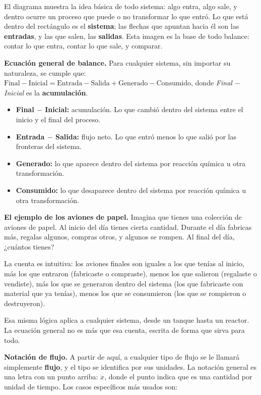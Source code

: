 El diagrama muestra la idea básica de todo sistema: algo entra, algo
sale, y dentro ocurre un proceso que puede o no transformar lo que
entró. Lo que está dentro del rectángulo es el \textbf{sistema}; las
flechas que apuntan hacia él son las \textbf{entradas}, y las que
salen, las \textbf{salidas}. Esta imagen es la base de todo balance:
contar lo que entra, contar lo que sale, y comparar.

\textbf{Ecuación general de balance.} Para cualquier sistema, sin
importar su naturaleza, se cumple que: \\
$\text{Final} - \text{Inicial} = \text{Entrada} - \text{Salida} + \text{Generado} - \text{Consumido}$,
donde \textit{Final $-$ Inicial} es la \textbf{acumulación}.

\begin{itemize}
    \item \textbf{Final $-$ Inicial:} acumulación. Lo que cambió
    dentro del sistema entre el inicio y el final del proceso.
    \item \textbf{Entrada $-$ Salida:} flujo neto. Lo que entró menos
    lo que salió por las fronteras del sistema.
    \item \textbf{Generado:} lo que aparece dentro del sistema por
    reacción química u otra transformación.
    \item \textbf{Consumido:} lo que desaparece dentro del sistema
    por reacción química u otra transformación.
\end{itemize}

\begin{notadidactica}
\textbf{El ejemplo de los aviones de papel.} Imagina que tienes una
colección de aviones de papel. Al inicio del día tienes cierta
cantidad. Durante el día fabricas más, regalas algunos, compras otros,
y algunos se rompen. Al final del día, ¿cuántos tienes?

La cuenta es intuitiva: los aviones finales son iguales a los que
tenías al inicio, más los que entraron (fabricaste o compraste), menos
los que salieron (regalaste o vendiste), más los que se generaron
dentro del sistema (los que fabricaste con material que ya tenías),
menos los que se consumieron (los que se rompieron o destruyeron).

Esa misma lógica aplica a cualquier sistema, desde un tanque hasta un
reactor. La ecuación general no es más que esa cuenta, escrita de
forma que sirva para todo.
\end{notadidactica}

\textbf{Notación de flujo.} A partir de aquí, a cualquier tipo de
flujo se le llamará simplemente \textbf{flujo}, y el tipo se
identifica por sus unidades. La notación general es una letra con un
punto arriba: $\dot{x}$, donde el punto indica que es una cantidad por
unidad de tiempo. Los casos específicos más usados son:

